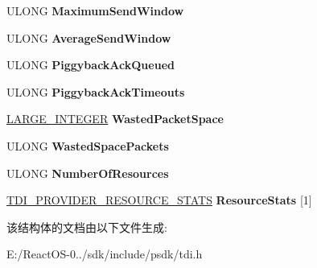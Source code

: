 \begin{DoxyCompactItemize}
U\+L\+O\+NG {\bfseries Maximum\+Send\+Window}
\item 
\mbox{\label{struct___t_d_i___p_r_o_v_i_d_e_r___s_t_a_t_i_s_t_i_c_s_a3c18e92859351cc607815dd601ccaa6e}} 
U\+L\+O\+NG {\bfseries Average\+Send\+Window}
\item 
\mbox{\label{struct___t_d_i___p_r_o_v_i_d_e_r___s_t_a_t_i_s_t_i_c_s_a3ba7c8f751f185047f3a692d2c02bab8}} 
U\+L\+O\+NG {\bfseries Piggyback\+Ack\+Queued}
\item 
\mbox{\label{struct___t_d_i___p_r_o_v_i_d_e_r___s_t_a_t_i_s_t_i_c_s_ab3ed11c38b1ff01bdc08b5862788e362}} 
U\+L\+O\+NG {\bfseries Piggyback\+Ack\+Timeouts}
\item 
\mbox{\label{struct___t_d_i___p_r_o_v_i_d_e_r___s_t_a_t_i_s_t_i_c_s_a5b1da67e2e8f2eb302175f096a790eee}} 
\hyperlink{union___l_a_r_g_e___i_n_t_e_g_e_r}{L\+A\+R\+G\+E\+\_\+\+I\+N\+T\+E\+G\+ER} {\bfseries Wasted\+Packet\+Space}
\item 
\mbox{\label{struct___t_d_i___p_r_o_v_i_d_e_r___s_t_a_t_i_s_t_i_c_s_a192eb7113655da5e200f685cf46330b9}} 
U\+L\+O\+NG {\bfseries Wasted\+Space\+Packets}
\item 
\mbox{\label{struct___t_d_i___p_r_o_v_i_d_e_r___s_t_a_t_i_s_t_i_c_s_a3b1e662ab46c57d3a15203d570c72152}} 
U\+L\+O\+NG {\bfseries Number\+Of\+Resources}
\item 
\mbox{\label{struct___t_d_i___p_r_o_v_i_d_e_r___s_t_a_t_i_s_t_i_c_s_ab6905bfd249c6252ef288d90ea0fc66c}} 
\hyperlink{struct___t_d_i___p_r_o_v_i_d_e_r___r_e_s_o_u_r_c_e___s_t_a_t_s}{T\+D\+I\+\_\+\+P\+R\+O\+V\+I\+D\+E\+R\+\_\+\+R\+E\+S\+O\+U\+R\+C\+E\+\_\+\+S\+T\+A\+TS} {\bfseries Resource\+Stats} \mbox{[}1\mbox{]}
\end{DoxyCompactItemize}


该结构体的文档由以下文件生成\+:\begin{DoxyCompactItemize}
\item 
E\+:/\+React\+O\+S-\/0../sdk/include/psdk/tdi.\+h\end{DoxyCompactItemize}
